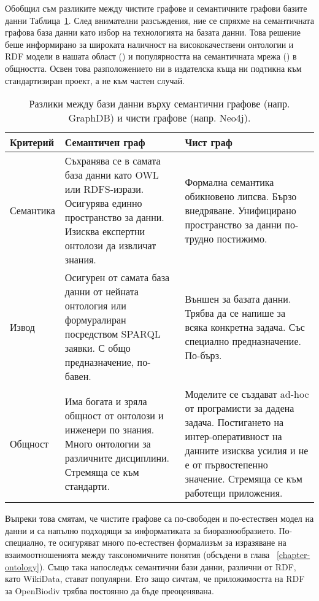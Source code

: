 Обобщил съм разликите между чистите графове и семантичните графови базите данни Таблица~\ref {graphdb-vs-neo4k}. След внимателни разсъждения, ние се спряхме на  семантичната графова база данни като избор на технологията на базата данни. Това решение беше информирано за широката наличност на висококачествени онтологии и RDF модели в нашата област (\cite{baskauf_darwin-sw:_2016, peroni_semantic_2014}) и популярността на семантичната мрежа (\cite{berners-lee_semantic_2001}) в общността. Освен това разположението ни в издателска къща ни подтикна към стандартизиран проект, а не към частен случай.

\begin{table}
\caption{Разлики между бази данни върху семантични графове (напр. GraphDB) и чисти графове (напр. Neo4j).}
\begin{tabular}{>{\centering\arraybackslash}m{2.5cm}|>{\centering\arraybackslash}m{4.2cm}|>{\centering\arraybackslash}m{4.2cm}}
Критерий   & Семантичен граф & Чист граф\\
\hline
Семантика & Съхранява се в самата база данни като OWL или RDFS-изрази. Осигурява единно пространство за данни. Изисква експертни онтолози да извличат знания. & Формална семантика обикновено липсва. Бързо внедряване. Унифицирано пространство за данни по-трудно постижимо. \\
\hline
Извод & Осигурен от самата база данни от нейната онтология или формуралиран посредством SPARQL заявки. С общо предназначение, по-бавен. & Външен за базата данни. Трябва да се напише за всяка конкретна задача. Със специално предназначение. По-бърз. \\
\hline
Общност & Има богата и зряла общност от онтолози и инженери по знания. Много онтологии за различните дисциплини. Стремяща се към стандарти. & Моделите се създават ad-hoc от програмисти за дадена задача. Постигането на интер-оперативност на данните изисква усилия и не е от първостепенно значение. Стремяща се към работещи приложения. \\
\hline
\end{tabular}
\label{graphdb-vs-neo4k}
\end{table}

Въпреки това смятам, че чистите графове са по-свободен и по-естествен модел на данни и са напълно подходящи за информатиката за биоразнообразието. По-специално, те осигуряват много по-естествен формализъм за изразяване на взаимоотношенията между таксономичните понятия (обсъдени в глава ~\ref{chapter-ontology}). Също така напоследък семантични бази данни, различни от RDF, като \mbox {WikiData}, стават популярни. Ето защо сичтам, че приложимостта на RDF за OpenBiodiv трябва постоянно да бъде преоценявана.

